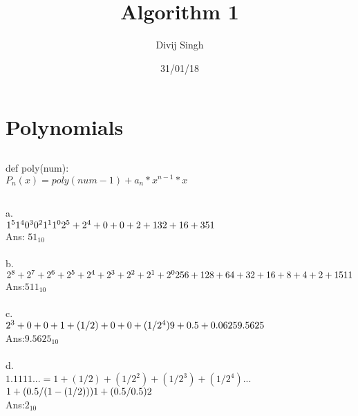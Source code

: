 \documentclass{article}
\title{Algorithm 1}
\author{Divij Singh}
\date{31/01/18}
\begin{document}
	\maketitle
	
	\section{Polynomials}
	\subsection{}
	
		def poly(num):\\
		$P_n (x) = poly(num-1) + a_n * x^{n-1} * x$
			
	\subsection{}
		
		a.\\
			$1^5 1^4 0^3 0^2 1^1 1^0\\
			2^5 + 2^4 + 0 + 0 + 2 +1\\
			32+16+3\\
			51$\\
			Ans: $51_{10}$\\
			\\
			
		b.\\
			$2^8 + 2^7 + 2^6 + 2^5 + 2^4 + 2^3 + 2^2 + 2^1 + 2^0\\
			256+128+64+32+16+8+4+2+1\\
			511$\\
			Ans:$511_{10}$\\
			\\
		c.\\
			$2^3 + 0 + 0 + 1 + (1/2) + 0 + 0 + (1/2^4)\\
			9+0.5+0.0625\\
			9.5625$\\
			Ans:$9.5625_{10}$\\
			\\
		d.\\
			$1.1111... = 1+(1/2)+(1/2^2)+(1/2^3)+(1/2^4)$...\\
			$1+ (0.5/(1-(1/2)))\\
			1+ (0.5/0.5)\\
			2$\\
			Ans:$2_{10}$\\
			
	\subsection{}
		
\end{document}
